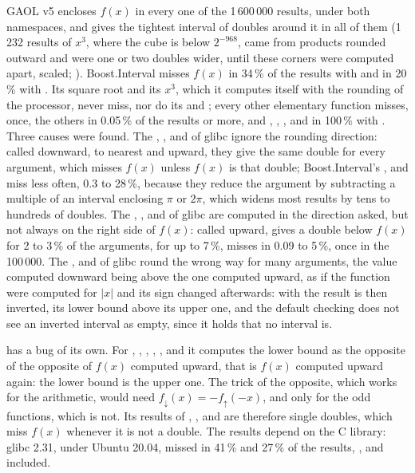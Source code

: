 \documentclass[12pt,a4paper,twoside,openright]{book}
\begin{document}
\medskip
GAOL v5 encloses $f(x)$ in every one of the 1\,600\,000 results, under both
namespaces, and gives the tightest interval of doubles around it in all of
them (1\,232 results of $x^3$, where the cube is below $2^{-968}$, came from
products rounded outward and were one or two doubles wider, until these
corners were computed apart, scaled; ). Boost.Interval
misses $f(x)$ in 34\,\% of the results with  and
in 20\,\% with . Its square root and its $x^3$,
which it computes itself with the rounding of the processor, never miss,
nor do its  and ; every other elementary function
misses,  once, the others in 0.05\,\% of the results or more, and
, , ,  and  in
100\,\% with . Three causes were found. The
, ,  and  of glibc ignore the
rounding direction: called downward, to nearest and upward, they give the
same double for every argument, which misses $f(x)$ unless $f(x)$ is that
double; Boost.Interval's ,  and  miss less
often, 0.3 to 28\,\%, because they reduce the argument by subtracting a
multiple of an interval enclosing $\pi$ or $2\pi$, which widens most results
by tens to hundreds of doubles. The , ,  and
 of glibc are computed in the direction asked, but not always on
the right side of $f(x)$: called upward,  gives a double below
$f(x)$ for 2 to 3\,\% of the arguments,  for up to 7\,\%,
 misses in 0.09 to 5\,\%,  once in the 100\,000. The
,  and  of glibc round the wrong way for
many arguments, the value computed downward being above the one computed
upward, as if the function were computed for $|x|$ and its sign changed
afterwards: with  the result is then inverted,
its lower bound above its upper one, and the default checking does not see
an inverted interval as empty, since it holds that no interval is.

\begin{Rem}
 has a bug of its own. For ,
, , , ,  and
 it computes the lower bound as the opposite of the opposite of
$f(x)$ computed upward, that is $f(x)$ computed upward again: the lower
bound is the upper one. The trick of the opposite, which works for the
arithmetic, would need $f_{\downarrow}(x) = -f_{\uparrow}(-x)$, and only for
the odd functions, which  is not. Its results of ,
,  and  are therefore single doubles,
which miss $f(x)$ whenever it is not a double. The results depend on the C
library: glibc 2.31, under Ubuntu 20.04, missed in 41\,\% and 27\,\% of the
results, ,  and  included.
\end{Rem}
\end{document}
